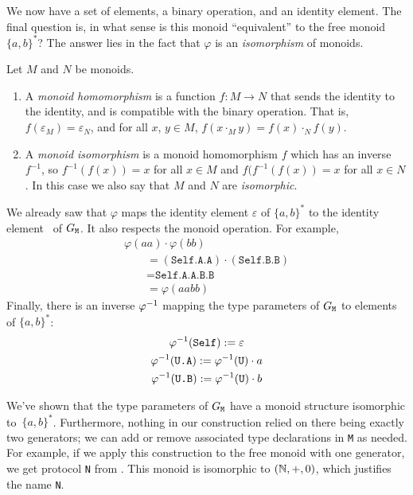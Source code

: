 \documentclass[../generics]{subfiles}
\begin{document}
We now have a set of elements, a binary operation, and an identity element. The final question is, in what sense is this monoid ``equivalent'' to the free monoid $\{a,b\}^*$? The answer lies in the fact that $\varphi$ is an \emph{isomorphism} of monoids.

\begin{definition}
Let $M$ and $N$ be monoids.
\begin{enumerate}
\item A \emph{monoid homomorphism} is a function $f\colon M\rightarrow N$ that sends the identity to the identity, and is compatible with the binary operation. That is, $f(\varepsilon_M)=\varepsilon_N$, and for all $x$, $y\in M$, $f(x\cdot_M y)=f(x)\cdot_N f(y)$.
\item A \emph{monoid isomorphism} is a monoid homomorphism $f$ which has an inverse $f^{-1}$, so $f^{-1}(f(x))=x$ for all $x\in M$ and $f(f^{-1}(f(x))=x$ for all $x\in N$. In this case we also say that $M$ and $N$ are \emph{isomorphic}.
\end{enumerate}
\end{definition}

We already saw that $\varphi$ maps the identity element $\varepsilon$ of $\{a,b\}^*$ to the identity element \tSelf\ of $G_\texttt{M}$. It also respects the monoid operation. For example,
\begin{gather*}
\varphi(aa)\cdot\varphi(bb)\\
\qquad {}=(\texttt{Self.A.A})\cdot(\texttt{Self.B.B})\\
\qquad {}=\texttt{Self.A.A.B.B}\\
\qquad {}=\varphi(aabb)
\end{gather*}
Finally, there is an inverse $\varphi^{-1}$ mapping the type parameters of $G_\texttt{M}$ to elements of $\{a,b\}^*$:
\begin{gather*}
\varphi^{-1}(\texttt{Self}):=\varepsilon\\
\varphi^{-1}(\texttt{U.A}):=\varphi^{-1}(\texttt{U})\cdot a\\
\varphi^{-1}(\texttt{U.B}):=\varphi^{-1}(\texttt{U})\cdot b
\end{gather*}

We've shown that the type parameters of $G_\texttt{M}$ have a monoid structure isomorphic to~$\{a,b\}^*$. Furthermore, nothing in our construction relied on there being exactly two generators; we can add or remove associated type declarations in \texttt{M} as needed. For example, if we apply this construction to the free monoid with one generator, we get protocol \texttt{N} from . This monoid is isomorphic to $(\mathbb{N},+,0)$, which justifies the name \texttt{N}.
\end{document}
